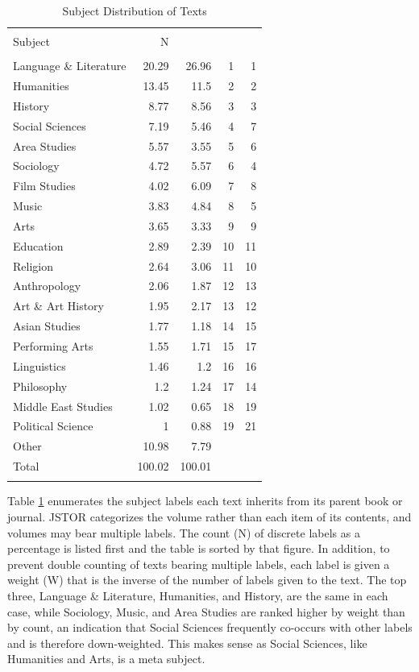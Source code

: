 \documentclass[]{book}
\theoremstyle{definition}
\theoremstyle{definition}
\theoremstyle{definition}
\theoremstyle{remark}
\begin{document}
\begin{table}[!htbp] \centering 
  \caption{Subject Distribution of Texts} 
  \label{tab:genre-jsubj} 
\begin{tabular}{@{\extracolsep{5pt}} lrrrr} 
\\[-1.8ex]\hline 
\hline \\[-1.8ex] 
Subject & N \\%
\hline \\[-1.8ex] 
Language \& Literature & 20.29 & 26.96 & 1 & 1 \\ 
Humanities & 13.45 & 11.5 & 2 & 2 \\ 
History & 8.77 & 8.56 & 3 & 3 \\ 
Social Sciences & 7.19 & 5.46 & 4 & 7 \\ 
Area Studies & 5.57 & 3.55 & 5 & 6 \\ 
Sociology & 4.72 & 5.57 & 6 & 4 \\ 
Film Studies & 4.02 & 6.09 & 7 & 8 \\ 
Music & 3.83 & 4.84 & 8 & 5 \\ 
Arts & 3.65 & 3.33 & 9 & 9 \\ 
Education & 2.89 & 2.39 & 10 & 11 \\ 
Religion & 2.64 & 3.06 & 11 & 10 \\ 
Anthropology & 2.06 & 1.87 & 12 & 13 \\ 
Art \& Art History & 1.95 & 2.17 & 13 & 12 \\ 
Asian Studies & 1.77 & 1.18 & 14 & 15 \\ 
Performing Arts & 1.55 & 1.71 & 15 & 17 \\ 
Linguistics & 1.46 & 1.2 & 16 & 16 \\ 
Philosophy & 1.2 & 1.24 & 17 & 14 \\ 
Middle East Studies & 1.02 & 0.65 & 18 & 19 \\ 
Political Science & 1 & 0.88 & 19 & 21 \\ 
Other & 10.98 & 7.79 &  &  \\ 
Total & 100.02 & 100.01 &  &  \\ 
\hline \\[-1.8ex] 
\end{tabular} 
\end{table}

Table \ref{tab:genre-jsubj} enumerates the subject labels each text
inherits from its parent book or journal. JSTOR categorizes the volume
rather than each item of its contents, and volumes may bear multiple
labels. The count (N) of discrete labels as a percentage is listed first
and the table is sorted by that figure. In addition, to prevent double
counting of texts bearing multiple labels, each label is given a weight
(W) that is the inverse of the number of labels given to the text. The
top three, Language \& Literature, Humanities, and History, are the same
in each case, while Sociology, Music, and Area Studies are ranked higher
by weight than by count, an indication that Social Sciences frequently
co-occurs with other labels and is therefore down-weighted. This makes
sense as Social Sciences, like Humanities and Arts, is a meta subject.
\end{document}

